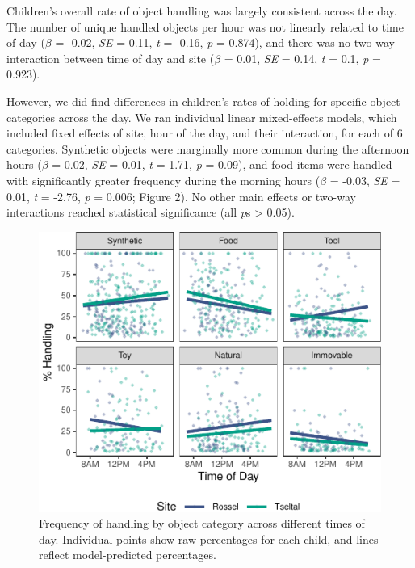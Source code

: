 \documentclass[10pt, letterpaper]{article}
\newenvironment{CodeChunk}{}{}
\begin{document}
Children's overall rate of object handling was largely consistent across
the day. The number of unique handled objects per hour was not linearly
related to time of day (\(\beta\) = -0.02, \emph{SE} = 0.11, \emph{t} =
-0.16, \emph{p} = 0.874), and there was no two-way interaction between
time of day and site (\(\beta\) = 0.01, \emph{SE} = 0.14, \emph{t} =
0.1, \emph{p} = 0.923).

However, we did find differences in children's rates of holding for
specific object categories across the day. We ran individual linear
mixed-effects models, which included fixed effects of site, hour of the
day, and their interaction, for each of 6 categories. Synthetic objects
were marginally more common during the afternoon hours (\(\beta\) =
0.02, \emph{SE} = 0.01, \emph{t} = 1.71, \emph{p} = 0.09), and food
items were handled with significantly greater frequency during the
morning hours (\(\beta\) = -0.03, \emph{SE} = 0.01, \emph{t} = -2.76,
\emph{p} = 0.006; Figure 2). No other main effects or two-way
interactions reached statistical significance (all \emph{p}s
\textgreater{} 0.05).

\begin{CodeChunk}
\begin{figure}[!ht]

{\centering \includegraphics{figs/tod-effects-fig-1} 

}

\caption[Frequency of handling by object category across different times of day]{Frequency of handling by object category across different times of day. Individual points show raw percentages for each child, and lines reflect model-predicted percentages.}\label{fig:tod-effects-fig}
\end{figure}
\end{CodeChunk}
\end{document}
